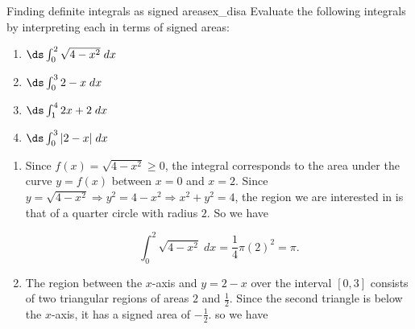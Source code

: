 \begin{example}{Finding definite integrals as signed areas}{ex_disa}
Evaluate the following integrals by interpreting each in terms of signed areas:
\begin{enumerate}
\item $ \ds \int_{0}^{2} \sqrt{4-x^2}\; dx $
\item $ \ds \int_{0}^{3} 2-x\; dx $
\item $ \ds \int_1^4 2x+2\; dx $
\item $ \ds \int_{0}^{3} |2-x|\; dx $
\end{enumerate}
\end{example}

\begin{solution}
\begin{enumerate}
\item Since $ f(x) =  \sqrt{4-x^2}\ge 0 $, the integral corresponds to the area under the curve $ y=f(x) $ between $ x=0 $ and $ x=2. $  Since $ y= \sqrt{4-x^2} \Rightarrow y^2=4-x^2\Rightarrow x^2+y^2=4 $, the region we are interested in is that of a quarter circle with radius $ 2 $. So we have

\begin{minipage}[c]{.3\textwidth}
\end{minipage}
\begin{minipage}[c]{.5\textwidth}
\begin{center}
\[
\int_{0}^{2} \sqrt{4-x^2}\; dx = \frac14 \pi (2)^2=\pi.
\]
\end{center}
\end{minipage}
\item The region between the $ x $-axis and $ y=2-x $ over the interval $ [0,3] $ consists of two triangular regions of areas $ 2 $ and $ \frac12 $. Since the second triangle is below the $ x $-axis, it has a signed area of $ -\frac{1}{2} $. so we have 


\end{enumerate}
\end{solution}
